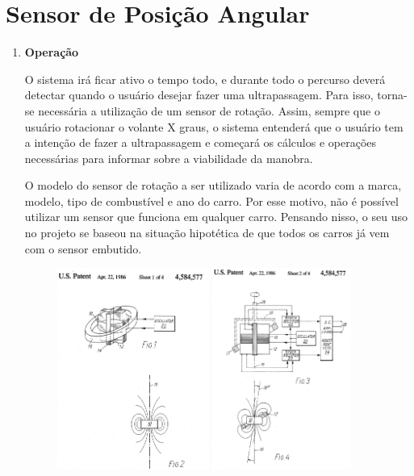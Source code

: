 \chapter[Sensor de Posição Angular]{Sensor de Posição Angular}

\begin{enumerate}
  \item \textbf{Operação}

    O sistema irá ficar ativo o tempo todo, e durante todo o percurso deverá detectar quando o usuário desejar fazer uma ultrapassagem. Para isso, torna-se necessária a utilização de um sensor de rotação. Assim, sempre que o usuário rotacionar o volante X graus, o sistema entenderá que o usuário tem a intenção de fazer a ultrapassagem e começará os cálculos e operações necessárias para informar sobre a viabilidade da manobra.

    O modelo do sensor de rotação a ser utilizado varia de acordo com a marca, modelo, tipo de combustível e ano do carro. Por esse motivo, não é possível utilizar um sensor que funciona em qualquer carro. Pensando nisso, o seu uso no projeto se baseou na situação hipotética de que todos os carros já vem com o sensor embutido.

    \begin{figure}[h]
      \centering
      \includegraphics[height=250px, scale=0.5]{figuras/patente1}
      \includegraphics[height=250px, scale=0.5]{figuras/patente2}
      \label{table:patente1}
    \end{figure}


\end{enumerate}
